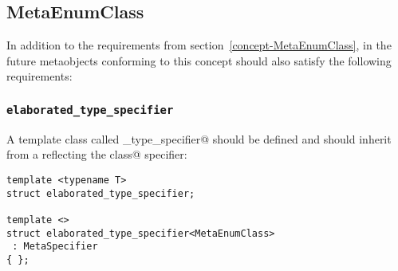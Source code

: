 \subsection{MetaEnumClass}

In addition to the requirements from section~\ref{concept-MetaEnumClass},
in the future metaobjects conforming to this concept should also
satisfy the following requirements:

\subsubsection{\texttt{elaborated\_type\_specifier}}

A template class called \verb@elaborated_type_specifier@ should be defined and should inherit from
a  reflecting the \verb@enum class@ specifier:

\begin{verbatim}
template <typename T>
struct elaborated_type_specifier;

template <>
struct elaborated_type_specifier<MetaEnumClass>
 : MetaSpecifier
{ };
\end{verbatim}
